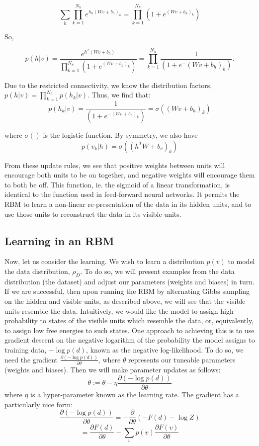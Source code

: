 \documentclass[11pt, oneside]{article}   	%
\begin{document}
$$\sum_h \prod_{k=1}^{N_h} e^{h_k(Wv + b_h)_k} = \prod_{k=1}^{N_h}(1 + e^{(Wv + b_h)_k})$$

So,

$$p(h | v) = \frac { e^{h^T(Wv + b_h)} } { \prod_{k=1}^{N_h}(1 + e^{(Wv + b_h)_k}) } 
= \prod_{k=1}^{N_h} \frac { 1 } { (1 + e^-{(Wv + b_h)_k}) } .$$

Due to the restricted connectivity, we know the distribution factors, $p(h | v) = \prod_{k=1}^{N_h} p(h_k | v)$.  Thus, we find that:
$$ p(h_k | v) = \frac { 1 } { (1 + e^{-(Wv + b_h)_k})} = \sigma ((Wv + b_h)_k)$$

where $\sigma()$ is the logistic function.  By symmetry, we also have
$$ p(v_k | h) = \sigma ((h^T W + b_v)_k)$$

From these update rules, we see that positive weights between units will encourage both units to be on together, and negative weights will encourage them to both be off.  This function, ie. the sigmoid of a linear transformation, is identical to the function used in feed-forward neural networks.  It permits the RBM to learn a non-linear re-presentation of the data in its hidden units, and to use those units to reconstruct the data in its visible units.  
 
 
\subsection{Learning in an RBM}

Now, let us consider the learning.  We wish to learn a distribution $p(v)$ to model the data distribution, $\rho_D$.  To do so, we will present examples from the data distribution (the dataset) and adjust our parameters (weights and biases) in turn.  If we are successful, then upon running the RBM by alternating Gibbs sampling on the hidden and visible units, as described above, we will see that the visible units resemble the data.  Intuitively, we would like the model to assign high probability to states of the visible units which resemble the data, or, equivalently, to assign low free energies to such states.  One approach to achieving this is to use gradient descent on the negative logarithm of the probability the model assigns to training data, $ - \log p(d) $, known as the negative log-likelihood.  To do so, we need the gradient $\frac{\partial (-\log p(d))}{\partial \theta}$, where $\theta$ represents our tuneable parameters (weights and biases).  Then we will make parameter updates as follows:
$$
\theta := \theta - \eta \frac{\partial (-\log p(d))}{\partial \theta}
$$
where $\eta$ is a hyper-parameter known as the learning rate.  The gradient has a particularly nice form: 
 $$ \frac{\partial (-\log p(d))}{\partial \theta} = - \frac{\partial}{\partial \theta} ( - F(d) - \log Z )$$
$$ = \frac{\partial F(d)}{\partial \theta} - \sum_v p(v) \frac{\partial F(v)}{\partial \theta} $$
  
\end{document}
